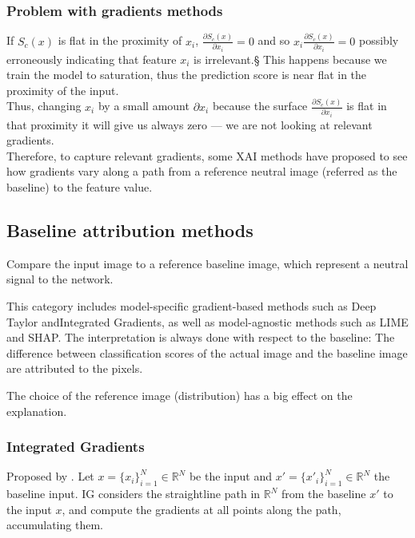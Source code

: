 \subsubsection{Problem with gradients methods}
If $S_c(x)$ is flat in the proximity of $x_i$, $\frac{\partial S_c(x)}{\partial x_i}=0$ and so $x_i\frac{\partial S_c(x)}{\partial x_i}=0$ possibly erroneously indicating that feature $x_i$ is irrelevant.§
This happens because we train the model to saturation, thus the prediction score is near flat in the proximity of the input.\\

Thus, changing $x_i$ by a small amount $\partial x_i$ because the surface $\frac{\partial S_c(x)}{\partial x_i}$ is flat in that proximity it
will give us always zero — we are not looking at relevant gradients.\\

Therefore, to capture relevant gradients, some XAI methods have proposed to see how
gradients vary along a path from a reference neutral image (referred as the baseline) to the
feature value.

\subsection{Baseline attribution methods}
Compare the input image to a reference baseline image, which represent a neutral signal to the network.

This category includes model-specific gradient-based methods such as Deep Taylor andIntegrated Gradients, as well as model-agnostic methods such as LIME and SHAP.
The interpretation is always done with respect to the baseline: The difference between
classification scores of the actual image and the baseline image are attributed to the pixels.

The choice of the reference image (distribution) has a big effect on the explanation.

\subsubsection{Integrated Gradients}
Proposed by \cite{DBLP:conf/icml/SundararajanTY17}.
Let $x=\{x_i\}_{i=1}^N\in\mathbb{R}^N$ be the input and $x'=\{x'_i\}_{i=1}^N\in\mathbb{R}^N$ the baseline input. 
IG considers the straightline path in $\mathbb{R}^N$ from the baseline $x'$ to the input $x$, and compute the gradients at all points
along the path, accumulating them.\\

